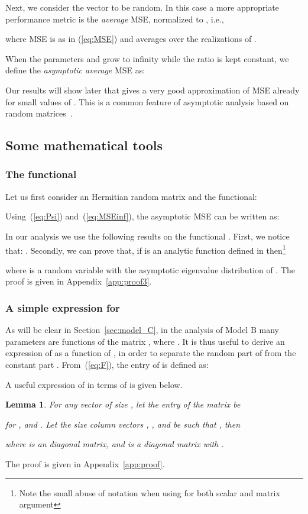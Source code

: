 \documentclass[final, a4paper]{IEEEtran}
\newtheorem{lem}{Lemma}[section]
\begin{document}
Next, we consider the vector  to be random.
In this case a more appropriate performance metric is the
{\em average} MSE, normalized to , i.e.,

where MSE is as in (\ref{eq:MSE}) and  averages over the realizations of .

When the parameters
 and  grow to infinity while the ratio  is kept constant, we
define the {\em asymptotic average} MSE as:

Our results will show later that  gives a very good approximation of MSE already for small
values of . This is a common feature of asymptotic analysis based on random matrices~\cite{TulinoVerdu}.

\subsection{Some mathematical tools}

\subsubsection{The functional }
\label{sec:free|probability}

Let us first consider an  Hermitian random matrix  and the functional:

Using~(\ref{eq:Psi}) and~(\ref{eq:MSEinf}), the asymptotic MSE can be written as:

In our analysis we use  the following results on the functional
. First, we notice that: . Secondly, we
can prove that, if  is an analytic function defined in  then\footnote{
Note the small abuse of notation
when using  for both scalar and matrix argument
}

where  is a random variable with the asymptotic eigenvalue distribution of .
The proof is given in Appendix~\ref{app:proof3}.


\subsubsection{A simple expression for }
As will be clear in Section~\ref{sec:model_C},
in the analysis of Model B many parameters are functions of
the matrix , where .
It is thus useful to derive an expression of  as a
function of , in order to separate the random part  of 
from the constant part . From~(\ref{eq:F}), the  entry of 
is defined as:

A useful expression of  in terms of  is given below.

\begin{lem}
\label{lemma:1}
For any vector  of size , let the  entry of the matrix
 be

for , and . Let the size  column vectors
, , and  be such that , then

where  is an  diagonal matrix, and
 is a  diagonal matrix with .
\end{lem}
\medskip
{} The proof is given in Appendix~\ref{app:proof}.
\end{document}
